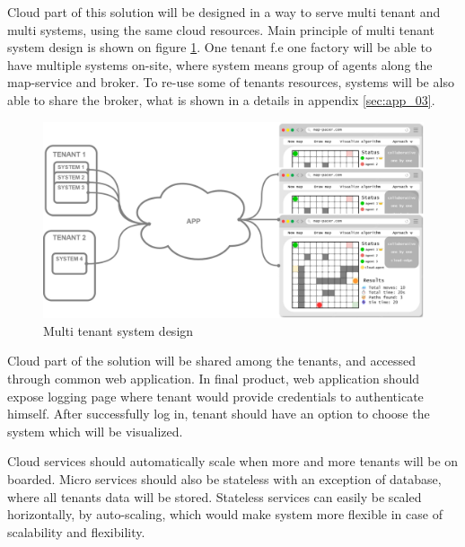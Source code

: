 Cloud part of this solution will be designed in a way to serve multi tenant and multi systems, using the same cloud resources.  Main principle of multi tenant system design is shown on figure \ref{fig:multi_tenant_simple}. One tenant f.e one factory will be able to have multiple systems on-site, where system means group of agents along the map-service and broker. To re-use some of tenants resources, systems will be also able to share the broker, what is shown in a details in appendix \ref{sec:app_03}.

\begin{figure}[H]
    \centering
    \includegraphics[width=\textwidth]{pictures/multi_tenant_simple.png}
    \caption{ Multi tenant system design }
    \label{fig:multi_tenant_simple}
\end{figure}


Cloud part of the solution will be shared among the tenants, and accessed through common web application. In final product, web application should expose logging page where tenant would provide credentials to authenticate himself. After successfully log in, tenant should have an option to choose the system which will be visualized. 

Cloud services should automatically scale when more and more tenants will be on boarded. Micro services should also be stateless with an exception of database, where all tenants data will be stored. Stateless services can easily be scaled horizontally, by auto-scaling, which would make system more flexible in case of scalability and flexibility.

